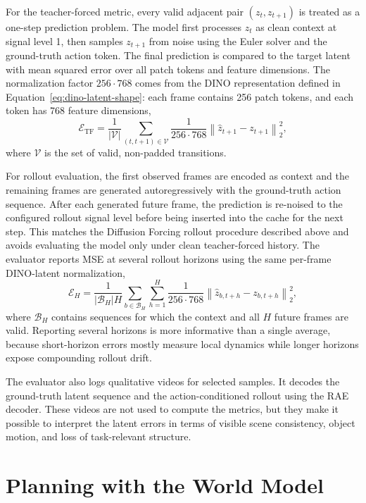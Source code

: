 \documentclass[12pt]{report}
\begin{document}
For the teacher-forced metric, every valid adjacent pair $(z_t,z_{t+1})$ is treated as a one-step prediction problem. The model first processes $z_t$ as clean context at signal level 1, then samples $z_{t+1}$ from noise using the Euler solver and the ground-truth action token. The final prediction is compared to the target latent with mean squared error over all patch tokens and feature dimensions. The normalization factor $256\cdot768$ comes from the DINO representation defined in Equation~\ref{eq:dino-latent-shape}: each frame contains 256 patch tokens, and each token has 768 feature dimensions,
\begin{equation}
\label{eq:teacher-forced-mse}
\mathcal{E}_{\mathrm{TF}} =
\frac{1}{|\mathcal{V}|}
\sum_{(t,t+1)\in\mathcal{V}}
\frac{1}{256\cdot768}
\left\|
\hat{z}_{t+1}-z_{t+1}
\right\|_2^2 ,
\end{equation}
where $\mathcal{V}$ is the set of valid, non-padded transitions.

For rollout evaluation, the first observed frames are encoded as context and the remaining frames are generated autoregressively with the ground-truth action sequence. After each generated future frame, the prediction is re-noised to the configured rollout signal level before being inserted into the cache for the next step. This matches the Diffusion Forcing rollout procedure described above and avoids evaluating the model only under clean teacher-forced history. The evaluator reports MSE at several rollout horizons using the same per-frame DINO-latent normalization,
\begin{equation}
\label{eq:rollout-mse}
\mathcal{E}_{H} =
\frac{1}{|\mathcal{B}_H|H}
\sum_{b\in\mathcal{B}_H}
\sum_{h=1}^{H}
\frac{1}{256\cdot768}
\left\|
\hat{z}_{b,t+h}-z_{b,t+h}
\right\|_2^2 ,
\end{equation}
where $\mathcal{B}_H$ contains sequences for which the context and all $H$ future frames are valid. Reporting several horizons is more informative than a single average, because short-horizon errors mostly measure local dynamics while longer horizons expose compounding rollout drift.

The evaluator also logs qualitative videos for selected samples. It decodes the ground-truth latent sequence and the action-conditioned rollout using the RAE decoder. These videos are not used to compute the metrics, but they make it possible to interpret the latent errors in terms of visible scene consistency, object motion, and loss of task-relevant structure.

\section{Planning with the World Model}
\end{document}
